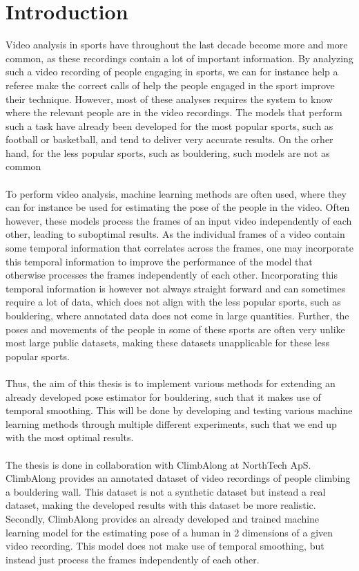 \documentclass[./main.tex]{subfiles}
\begin{document}
\section{Introduction}
Video analysis in sports have throughout the last decade become more and more common, as these recordings contain a lot of important information. By analyzing such a video recording of people engaging in sports, we can for instance help a referee make the correct calls of help the people engaged in the sport improve their technique. However, most of these analyses requires the system to know where the relevant people are in the video recordings. The models that perform such a task have already been developed for the most popular sports, such as football or basketball, and tend to deliver very accurate results. On the orher hand, for the less popular sports, such as bouldering, such models are not as common
\\
\\
To perform video analysis, machine learning methods are often used, where they can for instance be used for estimating the pose of the people in the video. Often however, these models process the frames of an input video independently of each other, leading to suboptimal results. As the individual frames of a video contain some temporal information that correlates across the frames, one may incorporate this temporal information to improve the performance of the model that otherwise processes the frames independently of each other. Incorporating this temporal information is however not always straight forward and can sometimes require a lot of data, which does not align with the less popular sports, such as bouldering, where annotated data does not come in large quantities. Further, the poses and movements of the people in some of these sports are often very unlike most large public datasets, making these datasets unapplicable for these less popular sports.
\\
\\
Thus, the aim of this thesis is to implement various methods for extending an already developed pose estimator for bouldering, such that it makes use of temporal smoothing. This will be done by developing and testing various machine learning methods through multiple different experiments, such that we end up with the most optimal results.
\\
\\
The thesis is done in collaboration with ClimbAlong at NorthTech ApS. ClimbAlong provides an annotated dataset of video recordings of people climbing a bouldering wall. This dataset is not a synthetic dataset but instead a real dataset, making the developed results with this dataset be more realistic. Secondly, ClimbAlong provides an already developed and trained machine learning model for the estimating pose of a human in 2 dimensions of a given video recording. This model does not make use of temporal smoothing, but instead just process the frames independently of each other.
\end{document}
